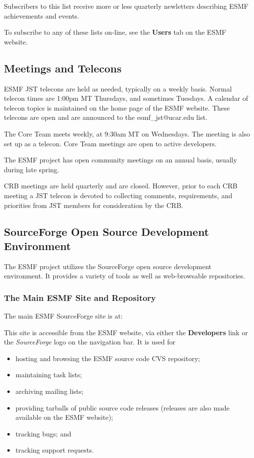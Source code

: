 Subscribers to this list receive more or less quarterly newletters
describing ESMF achievements and events.

To subscribe to any of these lists on-line, see the {\bf Users} 
tab on the ESMF website.

\subsection{Meetings and Telecons}

ESMF JST telecons are held as needed, typically on a weekly basis.
Normal telecon times are 1:00pm MT Thursdays, and sometimes Tuesdays.
A calendar of telecon topics is maintained on the home page of 
the ESMF website.  These telecons are open and are announced to 
the esmf\_jst@ucar.edu list.

The Core Team meets weekly, at 9:30am MT on Wednesdays.  The
meeting is also set up as a telecon.  Core Team meetings are open
to active developers.

The ESMF project has open community meetings on an annual basis,
usually during late spring.  

CRB meetings are held quarterly and are closed.  However, prior 
to each CRB meeting a JST telecon is devoted to collecting comments,
requirements, and priorities from JST members for consideration by
the CRB.  

\subsection{SourceForge Open Source Development Environment}
The ESMF project utilizes the SourceForge open source development
environment.  It provides a variety of tools as well as web-browsable
repositories.

\subsubsection{The Main ESMF Site and Repository}

The main ESMF SourceForge site is at:
\begin{center}
\end{center}

This site is accessible from the ESMF website,
via either the {\bf Developers} link or the {\it SourceForge}
logo on the navigation bar.  It is used for
\begin{itemize}
\item hosting and browsing the ESMF source code CVS repository; 
\item maintaining task lists;
\item archiving mailing lists;
\item providing tarballs of public source code releases (releases
      are also made available on the ESMF website);
\item tracking bugs; and 
\item tracking support requests.
\end{itemize}

